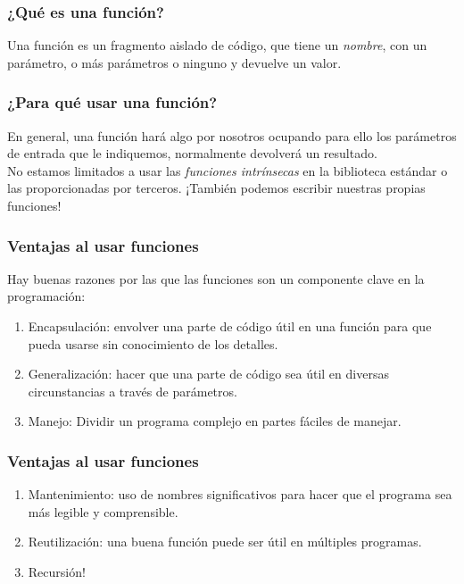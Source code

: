 \documentclass[12pt]{beamer}
\begin{document}
\begin{frame}
\frametitle{¿Qué es una función?}
Una función es un fragmento aislado de código, que tiene un \emph{nombre}, con un parámetro, o más parámetros o ninguno y devuelve un valor.
\end{frame}
\begin{frame}
\frametitle{¿Para qué usar una función?}
En general, una función hará algo por nosotros ocupando para ello los parámetros de entrada que le indiquemos, normalmente devolverá un resultado.
\\
\bigskip
\pause
No estamos limitados a usar las \emph{funciones intrínsecas} en la biblioteca estándar o las proporcionadas por terceros. \pause ¡También podemos escribir nuestras propias funciones!
\end{frame}
\begin{frame}
\frametitle{Ventajas al usar funciones}
Hay buenas razones por las que las funciones son un componente clave en la programación:
\begin{enumerate}[<+->]
\item Encapsulación: envolver una parte de código útil en una función para que pueda usarse sin conocimiento de los detalles.
\item Generalización: hacer que una parte de código sea útil en diversas circunstancias a través de parámetros.
\item Manejo: Dividir un programa complejo en partes fáciles de manejar.
\seti
\end{enumerate}
\end{frame}
\begin{frame}
\frametitle{Ventajas al usar funciones}
\begin{enumerate}[<+->]
\conti
\item Mantenimiento: uso de nombres significativos para hacer que el programa sea más legible y comprensible.
\item Reutilización: una buena función puede ser útil en múltiples programas.
\item Recursión!
\end{enumerate}
\end{frame}
\end{document}
